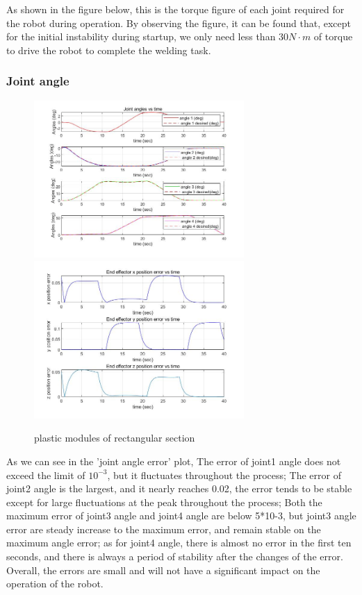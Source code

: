 As shown in the figure below, this is the torque figure of each joint required for the robot during operation. By observing the figure, it can be found that, except for the initial instability during startup, we only need less than $30N\cdot m$ of torque to drive the robot to complete the welding task.

\subsubsection*{Joint angle}

\begin{figure}[htbp]
    \centering
    \includegraphics[width=8cm]{./fig/4.jpg}
    \includegraphics[width=8cm]{./fig/6.jpg}
    \caption{plastic modules of rectangular section}
    \label{f1}
\end{figure}

As we can see in the 'joint angle error' plot, 
The error of joint1 angle does not exceed the limit of $10^{-3}$, but it fluctuates throughout the process;
The error of joint2 angle is the largest, and it nearly reaches 0.02, the error tends to be stable except for large fluctuations at the peak throughout the process;
Both the maximum error of joint3 angle and joint4 angle are below 5*10-3, but joint3 angle error are steady increase to the maximum error, and remain stable on the maximum angle error; as for joint4 angle, there is almost no error in the first ten seconds, and there is always a period of stability after the changes of the error.
Overall, the errors are small and will not have a significant impact on the operation of the robot.




